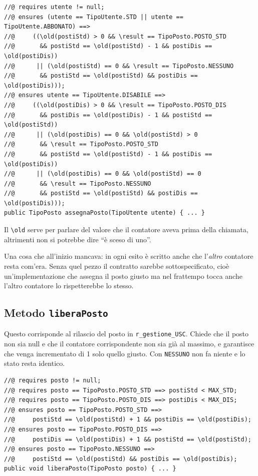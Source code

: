 \begin{lstlisting}[style=terminal, caption={Contratto di assegnaPosto}]
//@ requires utente != null;
//@ ensures (utente == TipoUtente.STD || utente == TipoUtente.ABBONATO) ==>
//@     ((\old(postiStd) > 0 && \result == TipoPosto.POSTO_STD
//@       && postiStd == \old(postiStd) - 1 && postiDis == \old(postiDis))
//@      || (\old(postiStd) == 0 && \result == TipoPosto.NESSUNO
//@       && postiStd == \old(postiStd) && postiDis == \old(postiDis)));
//@ ensures utente == TipoUtente.DISABILE ==>
//@     ((\old(postiDis) > 0 && \result == TipoPosto.POSTO_DIS
//@       && postiDis == \old(postiDis) - 1 && postiStd == \old(postiStd))
//@      || (\old(postiDis) == 0 && \old(postiStd) > 0
//@       && \result == TipoPosto.POSTO_STD
//@       && postiStd == \old(postiStd) - 1 && postiDis == \old(postiDis))
//@      || (\old(postiDis) == 0 && \old(postiStd) == 0
//@       && \result == TipoPosto.NESSUNO
//@       && postiStd == \old(postiStd) && postiDis == \old(postiDis)));
public TipoPosto assegnaPosto(TipoUtente utente) { ... }
\end{lstlisting}

Il \texttt{\textbackslash old} serve per parlare del valore che il contatore aveva prima
della chiamata, altrimenti non si potrebbe dire ``è sceso di uno''.

Una cosa che all'inizio mancava: in ogni esito è scritto anche che l'\emph{altro}
contatore resta com'era. Senza quel pezzo il contratto sarebbe sottospecificato,
cioè un'implementazione che assegna il posto giusto ma nel frattempo tocca anche l'altro
contatore lo rispetterebbe lo stesso.

\subsection{Metodo \texttt{liberaPosto}}

Questo corrisponde al rilascio del posto in \texttt{r\_gestione\_USC}. Chiede che il
posto non sia null e che il contatore corrispondente non sia già al massimo, e garantisce
che venga incrementato di 1 solo quello giusto. Con \texttt{NESSUNO} non fa niente e lo
stato resta identico.

\begin{lstlisting}[style=terminal, caption={Contratto di liberaPosto}]
//@ requires posto != null;
//@ requires posto == TipoPosto.POSTO_STD ==> postiStd < MAX_STD;
//@ requires posto == TipoPosto.POSTO_DIS ==> postiDis < MAX_DIS;
//@ ensures posto == TipoPosto.POSTO_STD ==>
//@     postiStd == \old(postiStd) + 1 && postiDis == \old(postiDis);
//@ ensures posto == TipoPosto.POSTO_DIS ==>
//@     postiDis == \old(postiDis) + 1 && postiStd == \old(postiStd);
//@ ensures posto == TipoPosto.NESSUNO ==>
//@     postiStd == \old(postiStd) && postiDis == \old(postiDis);
public void liberaPosto(TipoPosto posto) { ... }
\end{lstlisting}

